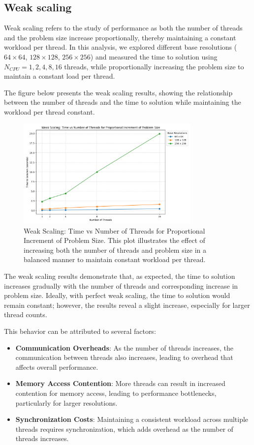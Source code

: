 \documentclass[unicode,11pt,a4paper,oneside,numbers=endperiod,openany]{scrartcl}
\begin{document}
\subsection{Weak scaling}
Weak scaling refers to the study of performance as both the number of threads and the problem size increase proportionally, thereby maintaining a constant workload per thread. In this analysis, we explored different base resolutions ($64 \times 64$, $128 \times 128$, $256 \times 256$) and measured the time to solution using $N_{CPU} = 1, 2, 4, 8, 16$ threads, while proportionally increasing the problem size to maintain a constant load per thread.

The figure below presents the weak scaling results, showing the relationship between the number of threads and the time to solution while maintaining the workload per thread constant.

\begin{figure}[h]
    \centering
    \includegraphics[width=0.8\textwidth]{pictures/weak_scaling_plot.png}
    \caption{Weak Scaling: Time vs Number of Threads for Proportional Increment of Problem Size. This plot illustrates the effect of increasing both the number of threads and problem size in a balanced manner to maintain constant workload per thread.}
    \label{fig:weak_scaling}
\end{figure}

The weak scaling results demonstrate that, as expected, the time to solution increases gradually with the number of threads and corresponding increase in problem size. Ideally, with perfect weak scaling, the time to solution would remain constant; however, the results reveal a slight increase, especially for larger thread counts.

This behavior can be attributed to several factors:
\begin{itemize}
    \item \textbf{Communication Overheads}: As the number of threads increases, the communication between threads also increases, leading to overhead that affects overall performance.
    \item \textbf{Memory Access Contention}: More threads can result in increased contention for memory access, leading to performance bottlenecks, particularly for larger resolutions.
    \item \textbf{Synchronization Costs}: Maintaining a consistent workload across multiple threads requires synchronization, which adds overhead as the number of threads increases.
\end{itemize}
\end{document}
